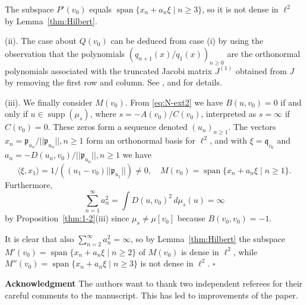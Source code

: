 \documentclass [12pt]{article}
\DeclareMathOperator{\spn}{span}
\DeclareMathOperator{\supp}{supp}
\begin{document}
The subspace $P'(v_0)$ equals $\spn\{x_n+a_n\xi \mid n\ge 3\}$, so it is not dense in $\ell^2$ by Lemma~\ref{thm:Hilbert}.

(ii).  The case about $Q(v_0)$  can be deduced from case (i) by using the observation that
the polynomials $(q_{n+1}(x)/q_1(x))_{n\ge 0}$ are the orthonormal polynomials associated with the truncated Jacobi matrix $J^{(1)}$ obtained from $J$ by removing the first row and column. See \cite[p. 28]{Ak}, \cite[p. 131, p. 144]{B:S5} and \cite{Pe} for details.

(iii). We finally consider $M(v_0)$. From \eqref{eq:N-ext2}  we have $B(u,v_0)=0$ if and only if $u\in\supp(\mu_s)$, where 
$s=-A(v_0)/C(v_0)$, interpreted as $s=\infty$ if $C(v_0)=0$.
These zeros form a sequence denoted $(u_n)_{n\ge 1}$. The vectors $x_n=\mathfrak{p}_{u_n}/||\mathfrak{p}_{u_n}||, n\ge 1$ form an orthonormal basis for $\ell^2$, and with $\xi=\mathfrak{q}_{v_0}$ and $a_n=-D(u_n,v_0)/||\mathfrak{p}_{u_n}||, n\ge 1$  we have
$$
\langle \xi, x_1\rangle=1/((u_1-v_0)||\mathfrak{p}_{u_1}||)\neq 0,\quad M(v_0)=\spn\{x_n+a_n\xi \mid n\ge 1\}.
$$  
Furthermore,
$$
\sum_{n=1}^\infty a_n^2= \int D(u,v_0)^2\,d\mu_s(u)=\infty
$$
by Proposition~\ref{thm:1-2}(iii) since $\mu_s\neq \mu[v_0]$ because $B(v_0,v_0)=-1$.

It is clear that also $\sum_{n=2}^\infty a_n^2=\infty$, so by Lemma~\ref{thm:Hilbert} the subspace
$M'(v_0)=\spn\{x_n+a_n\xi \mid n\ge 2\}$ of $M(v_0)$ is dense in $\ell^2$, while
$M''(v_0)=\spn\{x_n+a_n\xi \mid n\ge 3\}$ is not dense in $\ell^2$. \hfill$\square$

\medskip
{\bf Acknowledgment} The authors want to thank two  independent referees for their careful comments to the manuscript.  This has led to improvements of the paper.
\end{document}
